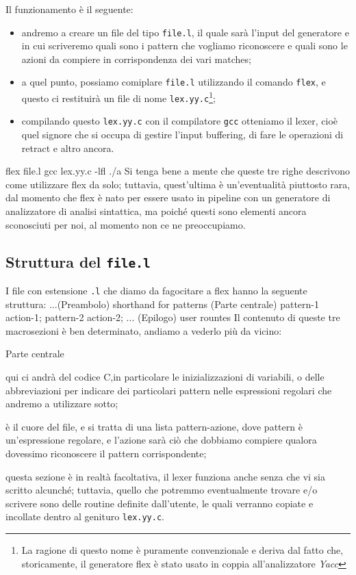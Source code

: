 \documentclass[class=book, crop=false, oneside, 12pt]{standalone}
\begin{document}
Il funzionamento è il seguente: 
\begin{itemize}
    \item andremo a creare un file del tipo \texttt{file.l}, il quale sarà l'input del generatore e in cui scriveremo quali sono i pattern che vogliamo riconoscere e quali sono le azioni da compiere in corrispondenza dei vari matches;
    \item a quel punto, possiamo comiplare \texttt{file.l} utilizzando il comando \texttt{flex}, e questo ci restituirà un file di nome \texttt{lex.yy.c}\footnote{La ragione di questo nome è puramente convenzionale e deriva dal fatto che, storicamente, il generatore flex è stato usato in coppia all'analizzatore \emph{Yacc}};
    \item compilando questo \texttt{lex.yy.c} con il compilatore \texttt{gcc} otteniamo il lexer, cioè quel signore che si occupa di gestire l'input buffering, di fare le operazioni di retract e altro ancora.
\end{itemize} 
flex file.l
gcc lex.yy.c -lfl
./a
Si tenga bene a mente che queste tre righe descrivono come utilizzare flex da solo; tuttavia, quest'ultima è un'eventualità piuttosto rara, dal momento che flex è nato per essere usato in pipeline con un generatore di analizzatore di analisi sintattica, ma poiché questi sono elementi ancora sconosciuti per noi, al momento non ce ne preoccupiamo.

\subsection{Struttura del \texttt{file.l}}
I file con estensione \texttt{.l} che diamo da fagocitare a flex hanno la seguente struttura:
...(Preambolo)
shorthand for patterns
(Parte centrale)
pattern-1 {action-1};
pattern-2 {action-2};
...
(Epilogo)
user rountes
Il contenuto di queste tre macrosezioni è ben determinato, andiamo a vederlo più da vicino:
\begin{labeling}{Parte centrale}
    \item[Preambolo] qui ci andrà del codice C,in particolare le inizializzazioni di variabili, o delle abbreviazioni per indicare dei particolari pattern nelle espressioni regolari che andremo a utilizzare sotto;
    \item[Parte centrale] è il cuore del file, e si tratta di una lista pattern-azione, dove pattern è un'espressione regolare, e l'azione sarà ciò che dobbiamo compiere qualora dovessimo riconoscere il pattern corrispondente;
    \item[Epilogo] questa sezione è in realtà facoltativa, il lexer funziona anche senza che vi sia scritto alcunché; tuttavia, quello che potremmo eventualmente trovare e/o scrivere sono delle routine definite dall'utente, le quali verranno copiate e incollate dentro al genituro \texttt{lex.yy.c}.
\end{labeling}
\end{document}
